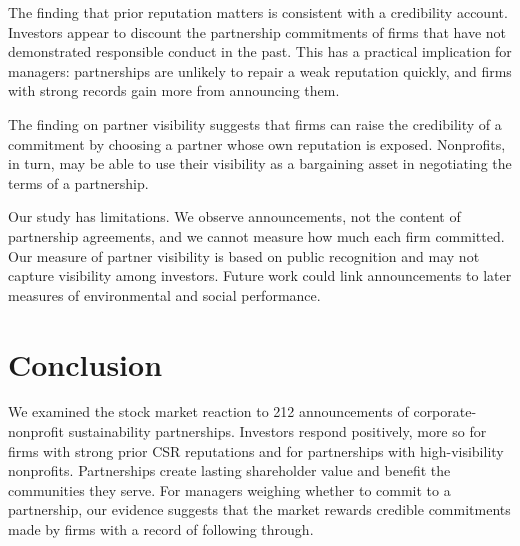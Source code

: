 \documentclass[11pt]{article}
\begin{document}
The finding that prior reputation matters is consistent with a credibility account. Investors appear to discount the partnership commitments of firms that have not demonstrated responsible conduct in the past. This has a practical implication for managers: partnerships are unlikely to repair a weak reputation quickly, and firms with strong records gain more from announcing them.

The finding on partner visibility suggests that firms can raise the credibility of a commitment by choosing a partner whose own reputation is exposed. Nonprofits, in turn, may be able to use their visibility as a bargaining asset in negotiating the terms of a partnership.

Our study has limitations. We observe announcements, not the content of partnership agreements, and we cannot measure how much each firm committed. Our measure of partner visibility is based on public recognition and may not capture visibility among investors. Future work could link announcements to later measures of environmental and social performance.

\section{Conclusion}

We examined the stock market reaction to 212 announcements of corporate-nonprofit sustainability partnerships. Investors respond positively, more so for firms with strong prior CSR reputations and for partnerships with high-visibility nonprofits. Partnerships create lasting shareholder value and benefit the communities they serve. For managers weighing whether to commit to a partnership, our evidence suggests that the market rewards credible commitments made by firms with a record of following through.
\end{document}
